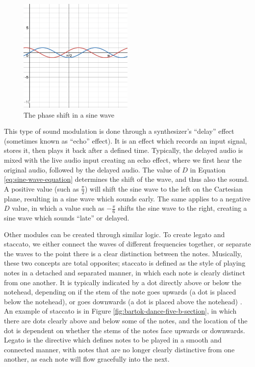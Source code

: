 \begin{figure}[ht]
	\centering
	\includegraphics[width=0.5\textwidth]{figures/sine-wave-phase-shift.png}
	\caption{The phase shift in a sine wave}
	\label{fig:sine-wave-phase-shift}
\end{figure}


This type of sound modulation is done through a synthesizer's ``delay'' effect (sometimes known as ``echo'' effect). It is an effect which records an input signal, stores it, then plays it back after a defined time. Typically, the delayed audio is mixed with the live audio input creating an echo effect, where we first hear the original audio, followed by the delayed audio. The value of $D$ in Equation \ref{eq:sine-wave-equation} determines the shift of the wave, and thus also the sound. A positive value (such as $\frac{\pi}{2}$) will shift the sine wave to the left on the Cartesian plane, resulting in a sine wave which sounds early. The same applies to a negative $D$ value, in which a value such as $-\frac{\pi}{6}$ shifts the sine wave to the right, creating a sine wave which sounds ``late'' or delayed.

Other modules can be created through similar logic. To create legato and staccato, we either connect the waves of different frequencies together, or separate the waves to the point there is a clear distinction between the notes. Musically, these two concepts are total opposites; staccato is defined as the style of playing notes in a detached and separated manner, in which each note is clearly distinct from one another. It is typically indicated by a dot directly above or below the notehead, depending on if the stem of the note goes upwards (a dot is placed below the notehead), or goes downwards (a dot is placed above the notehead) \cite{Burkholder_Grout_Palisca_2014}. An example of staccato is in Figure \ref{fig:bartok-dance-five-b-section}, in which there are dots clearly above and below some of the notes, and the location of the dot is dependent on whether the stems of the notes face upwards or downwards. Legato is the directive which defines notes to be played in a smooth and connected manner, with notes that are no longer clearly distinctive from one another, as each note will flow gracefully into the next.

